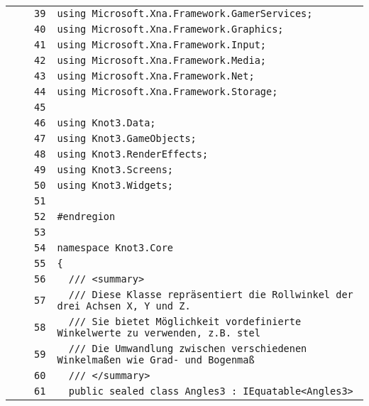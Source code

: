 \documentclass[a4paper,10pt]{article}
\begin{document}
\begin{longtable}[l]{lrrl}
\cellcolor{gray} &  & \verb~39~ & \verb~using Microsoft.Xna.Framework.GamerServices;~\\
\cellcolor{gray} &  & \verb~40~ & \verb~using Microsoft.Xna.Framework.Graphics;~\\
\cellcolor{gray} &  & \verb~41~ & \verb~using Microsoft.Xna.Framework.Input;~\\
\cellcolor{gray} &  & \verb~42~ & \verb~using Microsoft.Xna.Framework.Media;~\\
\cellcolor{gray} &  & \verb~43~ & \verb~using Microsoft.Xna.Framework.Net;~\\
\cellcolor{gray} &  & \verb~44~ & \verb~using Microsoft.Xna.Framework.Storage;~\\
\cellcolor{gray} &  & \verb~45~ & \verb~~\\
\cellcolor{gray} &  & \verb~46~ & \verb~using Knot3.Data;~\\
\cellcolor{gray} &  & \verb~47~ & \verb~using Knot3.GameObjects;~\\
\cellcolor{gray} &  & \verb~48~ & \verb~using Knot3.RenderEffects;~\\
\cellcolor{gray} &  & \verb~49~ & \verb~using Knot3.Screens;~\\
\cellcolor{gray} &  & \verb~50~ & \verb~using Knot3.Widgets;~\\
\cellcolor{gray} &  & \verb~51~ & \verb~~\\
\cellcolor{gray} &  & \verb~52~ & \verb~#endregion~\\
\cellcolor{gray} &  & \verb~53~ & \verb~~\\
\cellcolor{gray} &  & \verb~54~ & \verb~namespace Knot3.Core~\\
\cellcolor{gray} &  & \verb~55~ & \verb~{~\\
\cellcolor{gray} &  & \verb~56~ & \verb~  /// <summary>~\\
\cellcolor{gray} &  & \verb~57~ & \verb~  /// Diese Klasse repräsentiert die Rollwinkel der drei Achsen X, Y und Z.~\\
\cellcolor{gray} &  & \verb~58~ & \verb~  /// Sie bietet Möglichkeit vordefinierte Winkelwerte zu verwenden, z.B. stel~\\
\cellcolor{gray} &  & \verb~59~ & \verb~  /// Die Umwandlung zwischen verschiedenen Winkelmaßen wie Grad- und Bogenmaß~\\
\cellcolor{gray} &  & \verb~60~ & \verb~  /// </summary>~\\
\cellcolor{gray} &  & \verb~61~ & \verb~  public sealed class Angles3 : IEquatable<Angles3>~\\

\end{longtable}
\end{document}
